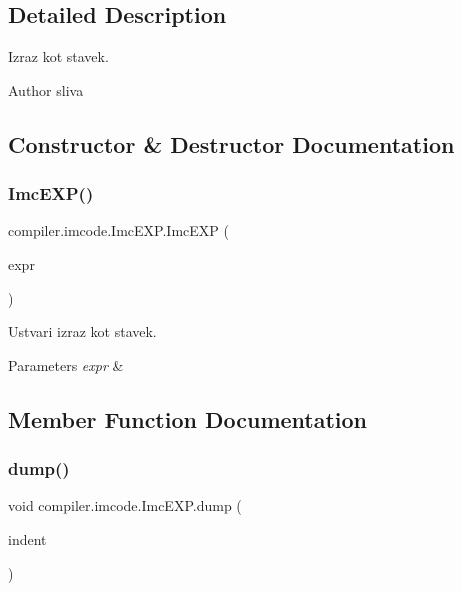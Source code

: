\subsection{Detailed Description}
Izraz kot stavek.

\begin{DoxyAuthor}{Author}
sliva 
\end{DoxyAuthor}


\subsection{Constructor \& Destructor Documentation}
\mbox{\label{classcompiler_1_1imcode_1_1_imc_e_x_p_aa8c9b2f6a453ad30994212dc24ca231a}} 
\subsubsection{\texorpdfstring{Imc\+E\+X\+P()}{ImcEXP()}}
{\footnotesize\ttfamily compiler.\+imcode.\+Imc\+E\+X\+P.\+Imc\+E\+XP (\begin{DoxyParamCaption}\item[{\hyperlink{classcompiler_1_1imcode_1_1_imc_expr}{Imc\+Expr}}]{expr }\end{DoxyParamCaption})}

Ustvari izraz kot stavek.


\begin{DoxyParams}{Parameters}
{\em expr} & \\
\hline
\end{DoxyParams}


\subsection{Member Function Documentation}
\mbox{\label{classcompiler_1_1imcode_1_1_imc_e_x_p_a7ad240b5522d827818a746023afd42ee}} 
\subsubsection{\texorpdfstring{dump()}{dump()}}
{\footnotesize\ttfamily void compiler.\+imcode.\+Imc\+E\+X\+P.\+dump (\begin{DoxyParamCaption}\item[{int}]{indent }\end{DoxyParamCaption})}

